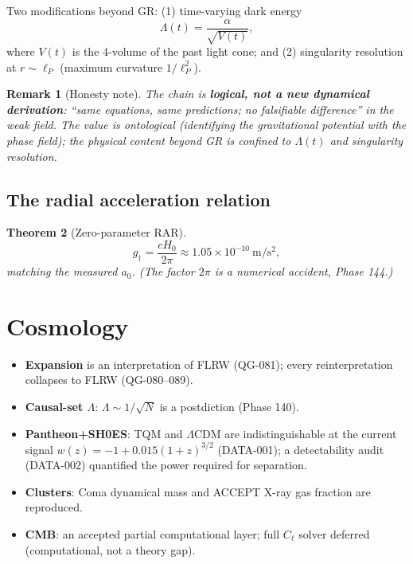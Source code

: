 \documentclass[11pt,twoside]{book}
\newtheorem{theorem}{Theorem}[chapter]
\newtheorem{remark}[theorem]{Remark}
\begin{document}
Two modifications beyond GR: (1) time-varying dark energy
\begin{equation}
\Lambda(t) = \frac{\alpha}{\sqrt{V(t)}},
\end{equation}
where $V(t)$ is the 4-volume of the past light cone; and (2) singularity resolution at
$r\sim\ell_P$ (maximum curvature $1/\ell_P^2$).

\begin{remark}[Honesty note]
The chain is \textbf{logical, not a new dynamical derivation}: ``same equations, same
predictions; no falsifiable difference'' in the weak field. The value is \emph{ontological}
(identifying the gravitational potential with the phase field); the physical content beyond
GR is confined to $\Lambda(t)$ and singularity resolution.
\end{remark}

\section{The radial acceleration relation}

\begin{theorem}[Zero-parameter RAR]
\begin{equation}
g_\dagger = \frac{c H_0}{2\pi} \approx 1.05\times10^{-10}\ \mathrm{m/s^2},
\end{equation}
matching the measured $a_0$. (The factor $2\pi$ is a numerical accident, Phase 144.)
\end{theorem}


\chapter{Cosmology}
\label{ch:cosmology}

\begin{itemize}
\item \textbf{Expansion} is an interpretation of FLRW (QG-081); every reinterpretation
collapses to FLRW (QG-080--089).
\item \textbf{Causal-set $\Lambda$}: $\Lambda\sim1/\sqrt{N}$ is a postdiction (Phase 140).
\item \textbf{Pantheon+SH0ES}: TQM and $\Lambda$CDM are indistinguishable at the current
signal $w(z)=-1+0.015(1+z)^{3/2}$ (DATA-001); a detectability audit (DATA-002) quantified
the power required for separation.
\item \textbf{Clusters}: Coma dynamical mass and ACCEPT X-ray gas fraction are reproduced.
\item \textbf{CMB}: an accepted partial computational layer; full $C_\ell$ solver deferred
(computational, not a theory gap).
\end{itemize}
\end{document}
